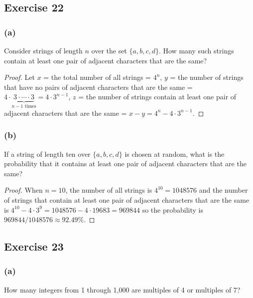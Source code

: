 \documentclass[14pt]{extarticle}
\begin{document}
\subsection{Exercise 22}
\subsubsection{(a)}
Consider strings of length $n$ over the set \(\{a, b, c, d\}\). How many such strings contain at least one pair of
adjacent characters that are the same?

\begin{proof}
     Let $x$ = the total number of all strings = \(4^n\), $y$ = the number of strings that have no pairs of adjacent characters
     that are the same = \(4 \cdot \underbrace{3 \cdot \cdots \cdot 3}_{n-1 \text{ times}} = 4 \cdot 3^{n-1}\), $z$ = the number
     of strings contain at least one pair of adjacent characters that are the same = \(x - y = 4^n - 4 \cdot 3^{n-1}\).
\end{proof}

\subsubsection{(b)}
If a string of length ten over \(\{a, b, c, d\}\) is chosen at random, what is the probability that it contains at
least one pair of adjacent characters that are the same?

\begin{proof}
     When $n=10$, the number of all strings is \(4^{10} = 1048576\) and the number of strings that contain at least
     one pair of adjacent characters that are the same is \(4^{10} - 4 \cdot 3^9 = 1048576 - 4 \cdot 19683 = 969844\)
     so the probability is \(969844 / 1048576 \approx 92.49\%\).
\end{proof}

\subsection{Exercise 23}
\subsubsection{(a)}
How many integers from 1 through 1,000 are multiples of 4 or multiples of 7?
\end{document}
